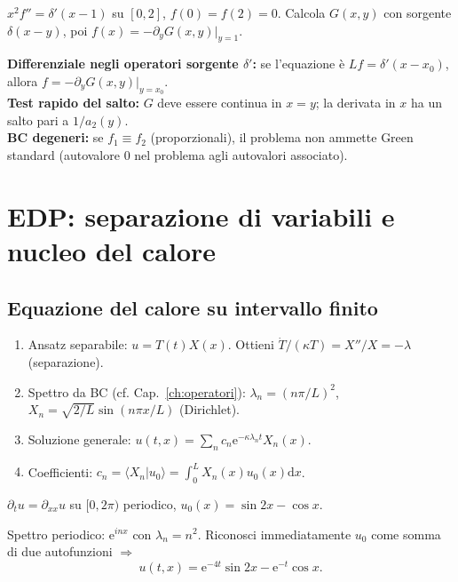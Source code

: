 \documentclass[11pt,a4paper,openany]{book}
\theoremstyle{definition}
\newcommand{\braket}[2]{\langle#1|#2\rangle}
\newcommand{\dd}{\mathrm{d}}
\newcommand{\eu}{\mathrm{e}}
\begin{document}
\begin{esempio}
$x^2 f''=\delta'(x-1)$ su $[0,2]$, $f(0)=f(2)=0$. Calcola $G(x,y)$ con sorgente $\delta(x-y)$, poi $f(x)=-\partial_y G(x,y)|_{y=1}$.
\end{esempio}

\begin{trucco}
\textbf{Differenziale negli operatori sorgente $\delta'$:} se l'equazione \`e $Lf=\delta'(x-x_0)$, allora $f=-\partial_y G(x,y)|_{y=x_0}$.\\
\textbf{Test rapido del salto:} $G$ deve essere continua in $x=y$; la derivata in $x$ ha un salto pari a $1/a_2(y)$.\\
\textbf{BC degeneri:} se $f_1\equiv f_2$ (proporzionali), il problema non ammette Green standard (autovalore $0$ nel problema agli autovalori associato).
\end{trucco}

\chapter{EDP: separazione di variabili e nucleo del calore}

\section{Equazione del calore su intervallo finito}

\begin{algoritmo}[{$\partial_t u=\kappa\partial_{xx}u$ su $[0,L]$, BC + dato $u(0,x)=u_0(x)$}]
\begin{enumerate}
\item Ansatz separabile: $u=T(t)X(x)$. Ottieni $\dot T/(\kappa T)=X''/X=-\lambda$ (separazione).
\item Spettro da BC (cf. Cap.~\ref{ch:operatori}): $\lambda_n=(n\pi/L)^2$, $X_n=\sqrt{2/L}\sin(n\pi x/L)$ (Dirichlet).
\item Soluzione generale: $u(t,x)=\sum_n c_n\eu^{-\kappa\lambda_n t}X_n(x)$.
\item Coefficienti: $c_n=\braket{X_n}{u_0}=\int_0^L X_n(x)u_0(x)\dd x$.
\end{enumerate}
\end{algoritmo}

\begin{esempio}[Scritto 05/11/2025, Es. 4]
$\partial_t u=\partial_{xx}u$ su $[0,2\pi)$ periodico, $u_0(x)=\sin 2x-\cos x$.

Spettro periodico: $\eu^{inx}$ con $\lambda_n=n^2$. Riconosci immediatamente $u_0$ come somma di due autofunzioni $\Rightarrow$
$$u(t,x)=\eu^{-4t}\sin 2x-\eu^{-t}\cos x.$$
\end{esempio}
\end{document}
